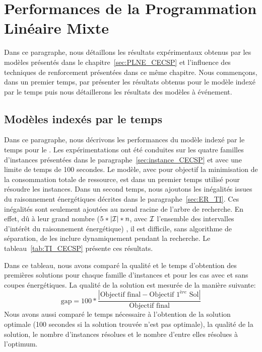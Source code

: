 \section{Performances de la Programmation Linéaire Mixte}
\label{sec:expe_PLNE}
Dans ce paragraphe, nous détaillons les résultats expérimentaux
obtenus par les modèles présentés dans le
chapitre~\ref{sec:PLNE_CECSP} et l'influence des techniques de
renforcement présentées dans ce même chapitre. Nous commençons, dans
un premier temps, par présenter les résultats obtenus pour le modèle
indexé par le temps puis nous détaillerons les résultats des modèles à événement.

\subsection{Modèles indexés par le temps}
Dans ce paragraphe, nous décrivons les performances du modèle indexé
par le temps pour le \CECSP. Les expérimentations ont été conduites
sur les quatre familles d'instances présentées dans le
paragraphe~\ref{sec:instance_CECSP} et avec une limite de temps de 100
secondes. Le modèle, avec pour objectif la minimisation de la
consommation totale de ressource, est dans un premier temps utilisé
pour résoudre les instances. Dans un second temps, nous ajoutons les
inégalités issues du raisonnement énergétiques décrites dans le
paragraphe~\ref{sec:ER_TI}. Ces inégalités sont seulement ajoutées au
n\oe ud racine de l'arbre de recherche. En effet, dû à leur grand
nombre ($5*|{\cal I}|*n$, avec ${\cal I}$ l'ensemble des intervalles d'intérêt du
raisonnement énergétique) , il est difficile, sans algorithme de
séparation, de les inclure dynamiquement pendant la recherche. Le
tableau~\ref{tab:TI_CECSP} présente ces résultats.

Dans ce tableau, nous avons comparé la qualité et le temps d'obtention
des premières solutions pour chaque famille d'instances et pour les
cas avec et sans coupes énergétiques. La qualité de la solution est
mesurée de la manière suivante: 
\[
  \text{gap}=100*\frac{|\text{Objectif final} - \text{Objectif } 1^{ère} \text{  Sol}|}{\text{Objectif final}}
\]
Nous avons aussi comparé le temps nécessaire à l'obtention de la
solution optimale (100 secondes si la solution trouvée n'est pas
optimale), la qualité de la solution, le nombre d'instances résolues
et le nombre d'entre elles résolues à l'optimum.

